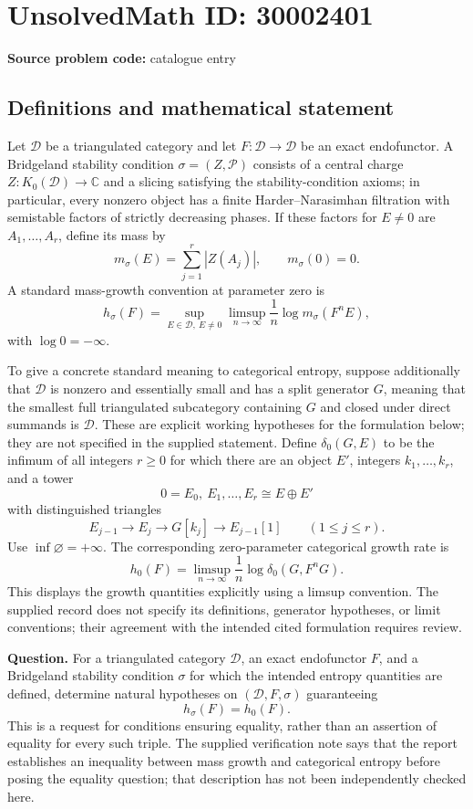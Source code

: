 \documentclass[11pt]{article}
\newcommand{\C}{\mathbb{C}}
\begin{document}
\section*{UnsolvedMath ID: 30002401}
\textbf{Source problem code:} catalogue entry
\subsection{Definitions and mathematical statement}
Let \(\mathcal D\) be a triangulated category and let \(F\colon\mathcal D\to\mathcal D\) be an exact endofunctor. A Bridgeland stability condition \(\sigma=(Z,\mathcal P)\) consists of a central charge \(Z\colon K_0(\mathcal D)\to\C\) and a slicing satisfying the stability-condition axioms; in particular, every nonzero object has a finite Harder--Narasimhan filtration with semistable factors of strictly decreasing phases. If these factors for \(E\ne0\) are \(A_1,\ldots,A_r\), define its mass by
\[
 m_\sigma(E)=\sum_{j=1}^r |Z(A_j)|,
 \qquad m_\sigma(0)=0.
\]
A standard mass-growth convention at parameter zero is
\[
 h_\sigma(F)=\sup_{E\in\mathcal D,\ E\ne0}
 \limsup_{n\to\infty}\frac{1}{n}\log m_\sigma(F^nE),
\]
with \(\log 0=-\infty\).

To give a concrete standard meaning to categorical entropy, suppose additionally that \(\mathcal D\) is nonzero and essentially small and has a split generator \(G\), meaning that the smallest full triangulated subcategory containing \(G\) and closed under direct summands is \(\mathcal D\). These are explicit working hypotheses for the formulation below; they are not specified in the supplied statement. Define \(\delta_0(G,E)\) to be the infimum of all integers \(r\geq0\) for which there are an object \(E'\), integers \(k_1,\ldots,k_r\), and a tower
\[
 0=E_0,\ E_1,\ldots,E_r\cong E\oplus E'
\]
with distinguished triangles
\[
 E_{j-1}\longrightarrow E_j\longrightarrow G[k_j]
 \longrightarrow E_{j-1}[1]
 \qquad(1\leq j\leq r).
\]
Use \(\inf\varnothing=+\infty\). The corresponding zero-parameter categorical growth rate is
\[
 h_0(F)=\limsup_{n\to\infty}
 \frac{1}{n}\log\delta_0(G,F^nG).
\]
This displays the growth quantities explicitly using a limsup convention. The supplied record does not specify its definitions, generator hypotheses, or limit conventions; their agreement with the intended cited formulation requires review.

\textbf{Question.} For a triangulated category \(\mathcal D\), an exact endofunctor \(F\), and a Bridgeland stability condition \(\sigma\) for which the intended entropy quantities are defined, determine natural hypotheses on \((\mathcal D,F,\sigma)\) guaranteeing
\[
 h_\sigma(F)=h_0(F).
\]
This is a request for conditions ensuring equality, rather than an assertion of equality for every such triple. The supplied verification note says that the report establishes an inequality between mass growth and categorical entropy before posing the equality question; that description has not been independently checked here.
\end{document}
